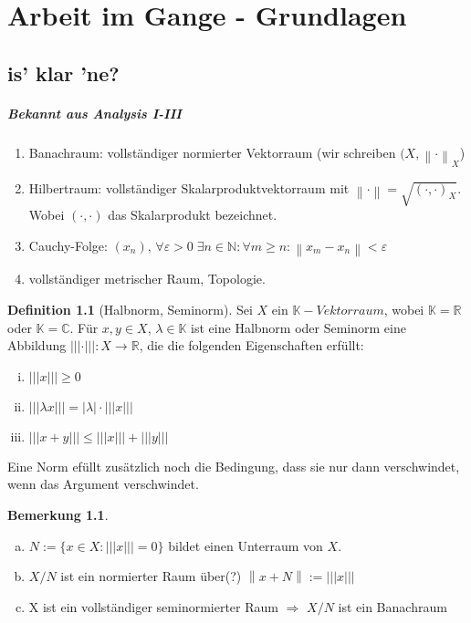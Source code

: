 \documentclass[ngerman]{report}
\theoremstyle{plain}%
\theoremstyle{definition}%
\newtheorem{definition}[thm]{Definition}
\theoremstyle{myStyle}
\newtheorem{bem}[thm]{Bemerkung}
\newcommand{\C}{\mathbb{C}}
\newcommand{\R}{\mathbb{R}}
\newcommand{\N}{\mathbb{N}}
\newcommand{\K}{\mathbb{K}}
\newcommand{\seminorm}[1]{||| #1 |||}
\newcommand{\norm}[1]{\left \|#1\right\| }
\begin{document}
\tableofcontents

\chapter{Arbeit im Gange - Grundlagen}
\section{is' klar 'ne?}

\paragraph{Bekannt aus Analysis I-III}

\begin{enumerate}[-]
	\item Banachraum: vollständiger normierter Vektorraum (wir schreiben $(X,\norm{\cdot }_X$) 
	\item Hilbertraum: vollständiger Skalarproduktvektorraum mit $\norm{\cdot } = \sqrt{(\cdot , \cdot )_X}$.  Wobei $(\cdot , \cdot )$ das Skalarprodukt bezeichnet.
	\item Cauchy-Folge: 
					$(x_n),\,  \forall \varepsilon > 0\; \exists n \in \N : \forall m \geq n : \norm{x_m-x_n}<\varepsilon$
	\item vollständiger metrischer Raum, Topologie.
\end{enumerate}

\begin{definition}[Halbnorm, Seminorm]

	Sei $X$ ein $\K-Vektorraum$, wobei $\K = \R$ oder $\K = \C$. 
	Für $x,y\in X$, $\lambda \in \K$ ist eine Halbnorm oder Seminorm eine Abbildung
	$\seminorm{\cdot}:X \rightarrow \R$, die die folgenden Eigenschaften erfüllt:

		\begin{enumerate}[(i)]
			\item $\seminorm{x}\geq 0$
			\item $\seminorm{\lambda x} = |\lambda|\cdot \seminorm{x}$
			\item $\seminorm{x+y} \leq \seminorm{x} + \seminorm{y}$
		\end{enumerate}
\end{definition}

Eine Norm efüllt zusätzlich noch die Bedingung, dass sie nur dann verschwindet, wenn das Argument verschwindet.

\begin{bem}
	\begin{enumerate}[(a)]
		\item $N:=\{x\in X: \seminorm{x}=0\}$ bildet einen Unterraum von $X$.
		\item $X/N$ ist ein normierter Raum über(?) $\norm{x+N} := \seminorm{x}$
		\item X ist ein vollständiger seminormierter Raum $\Rightarrow$ $X/N$ ist ein Banachraum 
	\end{enumerate}
\end{bem}
\end{document}
